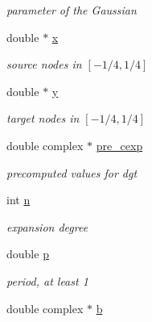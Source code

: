 \begin{CompactItemize}
\begin{CompactList}\small\item\em parameter of the Gaussian \item\end{CompactList}\item 
\hypertarget{structfgt__plan_o6}{
double $\ast$ \hyperlink{structfgt__plan_o6}{x}}
\label{structfgt__plan_o6}

\begin{CompactList}\small\item\em source nodes in $[-1/4,1/4]$ \item\end{CompactList}\item 
\hypertarget{structfgt__plan_o7}{
double $\ast$ \hyperlink{structfgt__plan_o7}{y}}
\label{structfgt__plan_o7}

\begin{CompactList}\small\item\em target nodes in $[-1/4,1/4]$ \item\end{CompactList}\item 
\hypertarget{structfgt__plan_o8}{
double complex $\ast$ \hyperlink{structfgt__plan_o8}{pre\_\-cexp}}
\label{structfgt__plan_o8}

\begin{CompactList}\small\item\em precomputed values for dgt \item\end{CompactList}\item 
\hypertarget{structfgt__plan_o9}{
int \hyperlink{structfgt__plan_o9}{n}}
\label{structfgt__plan_o9}

\begin{CompactList}\small\item\em expansion degree \item\end{CompactList}\item 
\hypertarget{structfgt__plan_o10}{
double \hyperlink{structfgt__plan_o10}{p}}
\label{structfgt__plan_o10}

\begin{CompactList}\small\item\em period, at least 1 \item\end{CompactList}\item 
\hypertarget{structfgt__plan_o11}{
double complex $\ast$ \hyperlink{structfgt__plan_o11}{b}}
\label{structfgt__plan_o11}


\end{CompactItemize}
